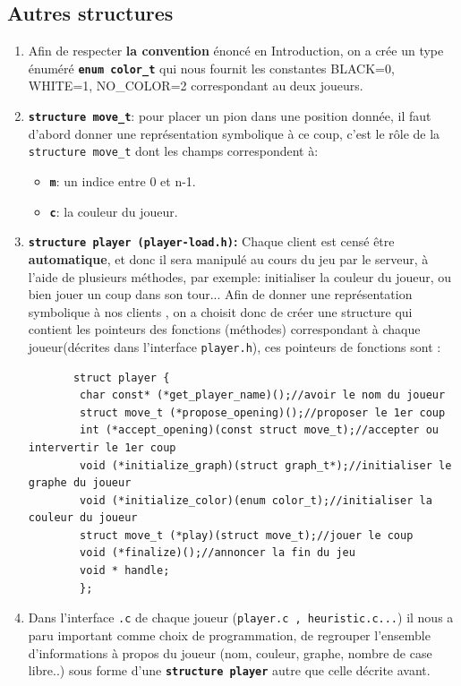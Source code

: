 \documentclass[a4paper,10pt]{article}
\begin{document}
\subsection{Autres structures}
\begin{enumerate}
    \item Afin de respecter \textbf{la convention} énoncé en Introduction, on a crée un type énuméré \textbf{\texttt{enum color\_t}} qui nous fournit les constantes BLACK=0, WHITE=1, NO\_COLOR=2  correspondant au deux joueurs.
    \item \textbf{\texttt{structure move\_t}}: pour placer un pion dans une position donnée, il faut d'abord donner une représentation symbolique à ce coup, c'est le rôle de la \texttt{structure move\_t} dont les champs correspondent à:
    \begin{itemize}
        \item \textbf{\texttt{m}}: un indice entre 0 et n-1.
        \item \textbf{\texttt{c}}: la couleur du joueur.
    \end{itemize}
    \item \textbf{\texttt{structure player (player-load.h)}:} Chaque client est censé être \textbf{automatique}, et donc il sera manipulé au cours du jeu par le serveur, à l'aide de plusieurs méthodes, par exemple: initialiser la couleur du joueur, ou bien jouer un coup dans son tour... Afin de donner une représentation symbolique à nos clients , on a choisit donc de créer une structure qui contient les pointeurs des fonctions (méthodes) correspondant à chaque joueur(décrites dans l'interface \texttt{player.h}), ces pointeurs de fonctions sont :
    \begin{center}
    
    \begin{lstlisting}
       struct player {
        char const* (*get_player_name)();//avoir le nom du joueur
        struct move_t (*propose_opening)();//proposer le 1er coup
        int (*accept_opening)(const struct move_t);//accepter ou intervertir le 1er coup
        void (*initialize_graph)(struct graph_t*);//initialiser le graphe du joueur
        void (*initialize_color)(enum color_t);//initialiser la couleur du joueur
        struct move_t (*play)(struct move_t);//jouer le coup
        void (*finalize)();//annoncer la fin du jeu
        void * handle;
        };
     \end{lstlisting}
    \end{center}
    \item Dans l'interface \texttt{.c} de chaque joueur (\texttt{player.c , heuristic.c...}) il nous a paru important comme choix de programmation, de regrouper l'ensemble d'informations à propos du joueur (nom, couleur, graphe, nombre de case libre..) sous forme d'une \textbf{\texttt{structure player}} autre que celle décrite avant.  
\end{enumerate}
\end{document}
